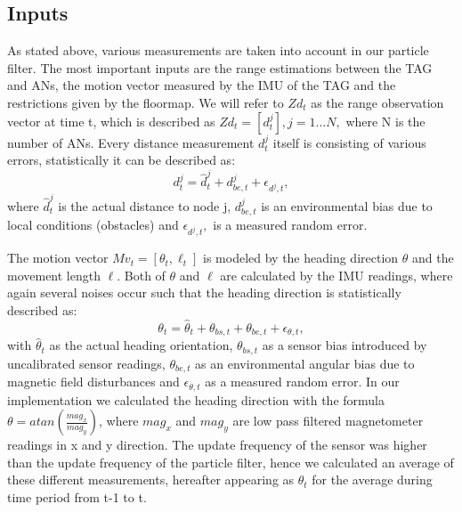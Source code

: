 \subsection{Inputs}
As stated above, various measurements are taken into account in our particle filter. The most important inputs are the range estimations between the TAG and ANs, the motion vector measured by the IMU of the TAG and the restrictions given by the floormap. We will refer to $Zd_{t}$ as the range observation vector at time t, which is described as $Zd_{t} = [d^{j}_{t}], j = 1...N,$ where N is the number of ANs. Every distance measurement $d^{j}_{t}$ itself is consisting of various errors, statistically it can be described as: 
$$d^{j}_{t} = \hat{d}^{j}_{t} + d^{j}_{be, t} + \epsilon_{d^{j}, t},$$
where $\hat{d}^{j}_{t}$ is the actual distance to node j, $d^{j}_{be, t}$ is an environmental bias due to local conditions (obstacles) and $\epsilon_{d^{j}, t},$ is a measured random error.

The motion vector $Mv_{t} = [\theta_{t}, \ell_{t}]$ is modeled by the heading direction $\theta$ and the movement length $\ell$. Both of $\theta$ and $\ell$ are calculated by the IMU readings, where again several noises occur such that the heading direction is statistically described as:
$$\theta_{t} = \hat{\theta}_{t} + \theta_{bs,t} + \theta_{be,t} + \epsilon_{\theta, t},$$
with $\hat{\theta}_{t}$ as the actual heading orientation,  $\theta_{bs,t}$ as a sensor bias introduced by uncalibrated sensor readings, $\theta_{be,t}$ as an environmental angular bias due to magnetic field disturbances and $\epsilon_{\theta, t}$ as a measured random error. 
In our implementation we calculated the heading direction with the formula $\theta = atan(\frac{mag_{x}}{mag_{y}})$, where $mag_{x}$ and $mag_{y}$ are low pass filtered magnetometer readings in x and y direction. The update frequency of the sensor was higher than the update frequency of the particle filter, hence we calculated an average of these different measurements, hereafter appearing as $\theta_{t}$ for the average during time period from t-1 to t.

